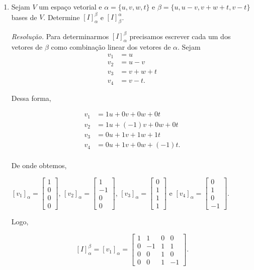 \begin{enumerate}
\item Sejam $V$ um espaço vetorial  e $\alpha=\{ u, v, w, t\}$ e $\beta=\{u, u-v, v+w+t, v-t\}$ bases de $V$. Determine $[I]_{\alpha}^{\beta}$ e $[I]_{\beta}^{\alpha}$.

\textit{Resolução.} Para determinarmos $[I]_{\alpha}^{\beta}$ precisamos escrever cada um dos vetores de   ${\beta}$ como combinação linear dos vetores de ${\alpha}$.
Sejam
\begin{align}
v_1&=u  \nonumber\\
v_2&=u-v \\
v_3&=v+w+t \nonumber \\
v_4&=v-t.\nonumber
\end{align}

 Dessa forma,

\begin{align*}
v_1&=1u+0v+0w+0t \\
v_2&=1u+(-1)v+0w+0t \\
v_3&=0u+1v+1w+1t \\
v_4&=0u+1v+0w+(-1)t. \\
\end{align*}

De onde obtemos,

$[v_1]_{\alpha}=\left[ \begin{array}{c} 1\\ 0\\ 0\\ 0\end{array}\right ]$, $[v_2]_{\alpha}=\left[ \begin{array}{c} 1\\ -1\\ 0\\ 0\end{array}\right ]$, $[v_3]_{\alpha}=\left[ \begin{array}{c} 0\\ 1\\ 1\\ 1\end{array}\right ]$ e $[v_4]_{\alpha}=\left[ \begin{array}{c} 0\\ 1\\ 0\\ -1\end{array}\right ]$.

 Logo,

$$[I]_{\alpha}^{\beta}= [v_1]_{\alpha}=\left[ \begin{array}{cccc} 1& 1 &0 &0\\ 0&-1&1&1\\ 0&0&1&0\\ 0&0&1&-1\end{array}\right ].$$



\end{enumerate}
